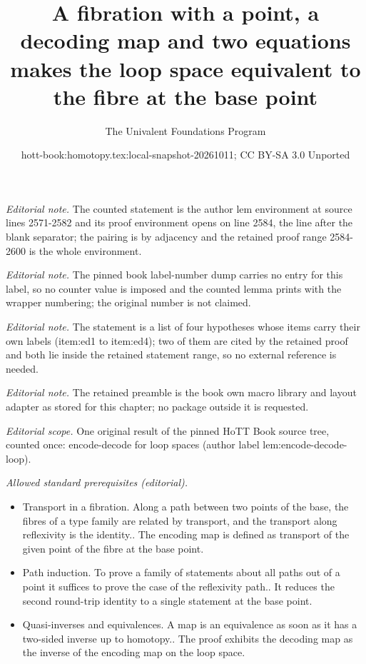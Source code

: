 \documentclass[10pt,a4paper]{article}
\title{A fibration with a point, a decoding map and two equations makes the loop space equivalent to the fibre at the base point}
\author{The Univalent Foundations Program}
\date{hott-book:homotopy.tex:local-snapshot-20261011; CC BY-SA 3.0 Unported}
\newcounter{chapter}
\theoremstyle{definition}
\theoremstyle{remark}
\numberwithin{equation}{section}
\begin{document}
\maketitle
\noindent\textit{Editorial note.} The counted statement is the author lem environment at source lines 2571-2582 and its proof environment opens on line 2584, the line after the blank separator; the pairing is by adjacency and the retained proof range 2584-2600 is the whole environment.\par\medskip
\noindent\textit{Editorial note.} The pinned book label-number dump carries no entry for this label, so no counter value is imposed and the counted lemma prints with the wrapper numbering; the original number is not claimed.\par\medskip
\noindent\textit{Editorial note.} The statement is a list of four hypotheses whose items carry their own labels (item:ed1 to item:ed4); two of them are cited by the retained proof and both lie inside the retained statement range, so no external reference is needed.\par\medskip
\noindent\textit{Editorial note.} The retained preamble is the book own macro library and layout adapter as stored for this chapter; no package outside it is requested.\par\medskip
\noindent\textit{Editorial scope.} One original result of the pinned HoTT Book source tree, counted once: encode-decode for loop spaces (author label lem:encode-decode-loop).\par\medskip
\noindent\textit{Allowed standard prerequisites (editorial).}\begin{itemize}
\item Transport in a fibration. Along a path between two points of the base, the fibres of a type family are related by transport, and the transport along reflexivity is the identity.. The encoding map is defined as transport of the given point of the fibre at the base point.
\item Path induction. To prove a family of statements about all paths out of a point it suffices to prove the case of the reflexivity path.. It reduces the second round-trip identity to a single statement at the base point.
\item Quasi-inverses and equivalences. A map is an equivalence as soon as it has a two-sided inverse up to homotopy.. The proof exhibits the decoding map as the inverse of the encoding map on the loop space.
\end{itemize}\medskip
\end{document}
